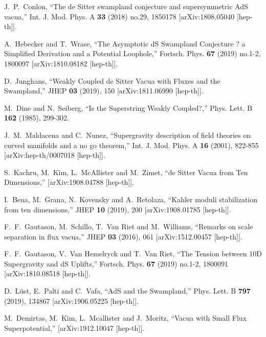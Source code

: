 \documentclass[12pt]{article}
\numberwithin{equation}{section}
\begin{document}
\begin{thebibliography}{999}
J.~P.~Conlon,
``The de Sitter swampland conjecture and supersymmetric AdS vacua,''
Int. J. Mod. Phys. A \textbf{33} (2018) no.29, 1850178
[arXiv:1808.05040 [hep-th]].

A.~Hebecker and T.~Wrase,
``The Asymptotic dS Swampland Conjecture ? a Simplified Derivation and a Potential Loophole,''
Fortsch. Phys. \textbf{67} (2019) no.1-2, 1800097
[arXiv:1810.08182 [hep-th]].

D.~Junghans,
``Weakly Coupled de Sitter Vacua with Fluxes and the Swampland,''
JHEP \textbf{03} (2019), 150
[arXiv:1811.06990 [hep-th]].

M.~Dine and N.~Seiberg,
``Is the Superstring Weakly Coupled?,''
Phys. Lett. B \textbf{162} (1985), 299-302.

J.~M.~Maldacena and C.~Nunez,
``Supergravity description of field theories on curved manifolds and a no go theorem,''
Int. J. Mod. Phys. A \textbf{16} (2001), 822-855
[arXiv:hep-th/0007018 [hep-th]].

S.~Kachru, M.~Kim, L.~McAllister and M.~Zimet,
``de Sitter Vacua from Ten Dimensions,''
[arXiv:1908.04788 [hep-th]].

I.~Bena, M.~Grana, N.~Kovensky and A.~Retolaza,
``Kahler moduli stabilization from ten dimensions,''
JHEP \textbf{10} (2019), 200
[arXiv:1908.01785 [hep-th]].

F.~F.~Gautason, M.~Schillo, T.~Van Riet and M.~Williams,
``Remarks on scale separation in flux vacua,''
JHEP \textbf{03} (2016), 061
[arXiv:1512.00457 [hep-th]].

F.~F.~Gautason, V.~Van Hemelryck and T.~Van Riet,
``The Tension between 10D Supergravity and dS Uplifts,''
Fortsch. Phys. \textbf{67} (2019) no.1-2, 1800091
[arXiv:1810.08518 [hep-th]].

D.~L\"ust, E.~Palti and C.~Vafa,
``AdS and the Swampland,''
Phys. Lett. B \textbf{797} (2019), 134867
[arXiv:1906.05225 [hep-th]].

M.~Demirtas, M.~Kim, L.~Mcallister and J.~Moritz,
``Vacua with Small Flux Superpotential,''
[arXiv:1912.10047 [hep-th]].


\end{thebibliography}
\end{document}
